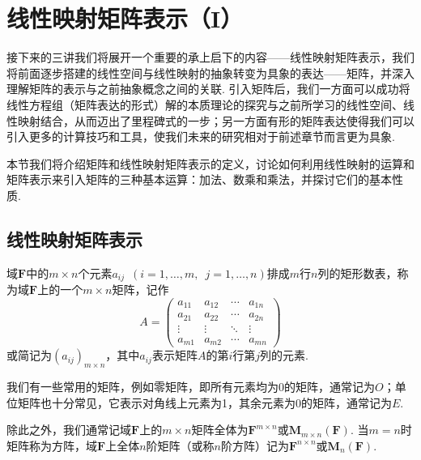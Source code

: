 \chapter{线性映射矩阵表示（I）}

接下来的三讲我们将展开一个重要的承上启下的内容——线性映射矩阵表示，我们将前面逐步搭建的线性空间与线性映射的抽象转变为具象的表达——矩阵，并深入理解矩阵的表示与之前抽象概念之间的关联. 引入矩阵后，我们一方面可以成功将线性方程组（矩阵表达的形式）解的本质理论的探究与之前所学习的线性空间、线性映射结合，从而迈出了里程碑式的一步；另一方面有形的矩阵表达使得我们可以引入更多的计算技巧和工具，使我们未来的研究相对于前述章节而言更为具象.

本节我们将介绍矩阵和线性映射矩阵表示的定义，讨论如何利用线性映射的运算和矩阵表示来引入矩阵的三种基本运算：加法、数乘和乘法，并探讨它们的基本性质.

\section{线性映射矩阵表示}

\begin{definition}
    域$\mathbf{F}$中的$m\times n$个元素$a_{ij}\enspace(i=1,\ldots,m,\enspace j=1,\ldots,n)$排成$m$行$n$列的矩形数表，称为域$\mathbf{F}$上的一个$m\times n$矩阵，记作
    \[A=\begin{pmatrix}
            a_{11} & a_{12} & \cdots & a_{1n} \\
            a_{21} & a_{22} & \cdots & a_{2n} \\
            \vdots & \vdots & \ddots & \vdots \\
            a_{m1} & a_{m2} & \cdots & a_{mn}
        \end{pmatrix}\]
    或简记为$(a_{ij})_{m\times n}$，其中$a_{ij}$表示矩阵$A$的第$i$行第$j$列的元素.
\end{definition}

我们有一些常用的矩阵，例如零矩阵，即所有元素均为0的矩阵，通常记为$O$；单位矩阵也十分常见，它表示对角线上元素为1，其余元素为0的矩阵，通常记为$E$.

除此之外，我们通常记域$\mathbf{F}$上的$m\times n$矩阵全体为$\mathbf{F}^{m\times n}$或$\mathbf{M}_{m\times n}(\mathbf{F})$. 当$m=n$时矩阵称为方阵，域$\mathbf{F}$上全体$n$阶矩阵（或称$n$阶方阵）记为$\mathbf{F}^{n\times n}$或$\mathbf{M}_n(\mathbf{F})$.

